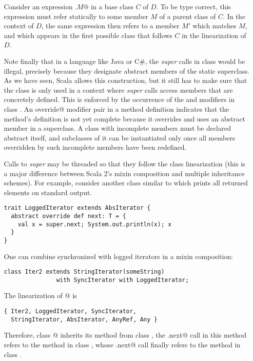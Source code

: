 \documentclass[a4paper,11pt,twoside]{article}
\begin{document}
\begin{definition}
Consider an expression \lstinline@super.$M$@ in a base class $C$ of
$D$.  To be type correct, this expression must refer statically to
some member $M$ of a parent class of $C$. In the context of $D$, the
same expression then refers to a member $M'$ which matches $M$, and
which appears in the first possible class that follows $C$ in the
linearization of $D$.
\end{definition}
Note finally that in a language like Java or C\#, the
{\em super} calls in class \lstinline@SyncIterator@ would be
illegal, precisely because they designate abstract members of the
static superclass. As we have seen, Scala allows this construction,
but it still has to make sure that the class is only used in a context
where {\em super} calls access members that are concretely
defined. This is enforced by the occurrence of the
\lstinline@abstract@ and
\lstinline@override@ modifiers in class \lstinline@SyncIterator@. An
\lstinline@abstract override@ modifier pair in a method definition
indicates that the method's definition is not yet complete because it
overrides and uses an abstract member in a superclass. A class with
incomplete members must be declared abstract itself, and subclasses of
it can be instantiated only once all members overridden by such
incomplete members have been redefined.

Calls to {\em super} may be threaded so that they follow the class
linearization (this is a major difference between Scala 2's mixin
composition and multiple inheritance schemes). For example, consider
another class similar to \lstinline@SyncIterator@ which prints all
returned elements on standard output.
\begin{lstlisting}
trait LoggedIterator extends AbsIterator {
  abstract override def next: T = { 
    val x = super.next; System.out.println(x); x 
  }
}
\end{lstlisting}
One can combine synchronized with logged iterators in a mixin
composition:\medskip

\begin{lstlisting}
class Iter2 extends StringIterator(someString) 
               with SyncIterator with LoggedIterator;         
\end{lstlisting}
The linearization of @ is
\begin{lstlisting}
{ Iter2, LoggedIterator, SyncIterator, 
  StringIterator, AbsIterator, AnyRef, Any }
\end{lstlisting}
Therefore, class @ inherits 
its \lstinline@next@ method from class \lstinline@LoggedIterator@,
the \lstinline@super.next@ call in this method refers
to the \lstinline@next@ method in class \lstinline@SyncIterator@, whose  
\lstinline@super.next@ call finally refers to the
\lstinline@next@ method in class \lstinline@StringIterator@.
\end{document}
